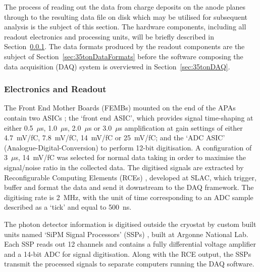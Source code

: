 The process of reading out the data from charge deposits on the anode planes through to the resulting data file on disk which may be utilised for subsequent analysis is the subject of this section.  The hardware components, including all readout electronics and processing units, will be briefly described in Section~\ref{sec:35tonElectronicsReadout}.  The data formats produced by the readout components are the subject of Section~\ref{sec:35tonDataFormats} before the software composing the data acquisition (DAQ) system is overviewed in Section~\ref{sec:35tonDAQ}.

\subsubsection{Electronics and Readout}\label{sec:35tonElectronicsReadout}

The Front End Mother Boards (FEMBs) mounted on the end of the APAs contain two ASICs \cite{DeGeronimo2011,Thorn2012}; the `front end ASIC', which provides signal time-shaping at either 0.5~$\mu$s, 1.0~$\mu$s, 2.0~$\mu$s or 3.0~$\mu$s amplification at gain settings of either 4.7~mV/fC, 7.8~mV/fC, 14~mV/fC or 25~mV/fC; and the `ADC ASIC' (Analogue-Digital-Conversion) to perform 12-bit digitisation.  A configuration of 3~$\mu$s, 14~mV/fC was selected for normal data taking in order to maximise the signal/noise ratio in the collected data.  The digitised signals are extracted by Reconfigurable Computing Elements (RCEs) \cite{Herbst2014}, developed at SLAC, which trigger, buffer and format the data and send it downstream to the DAQ framework.  The digitising rate is 2~MHz, with the unit of time corresponding to an ADC sample described as a `tick' and equal to 500~ns.


The photon detector information is digitised outside the cryostat by custom built units named `SiPM Signal Processors' (SSPs) \cite{SSPManual2016}, built at Argonne National Lab.  Each SSP reads out 12 channels and contains a fully differential voltage amplifier and a 14-bit ADC for signal digitisation.  Along with the RCE output, the SSPs transmit the processed signals to separate computers running the DAQ software.

